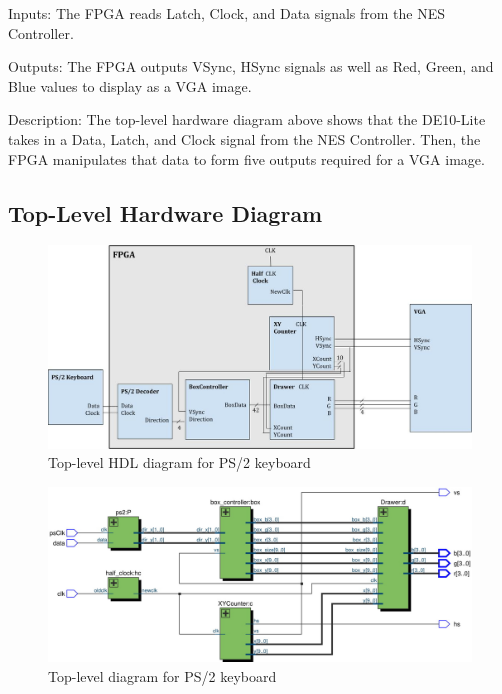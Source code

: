\documentclass[12pt]{article}
\numberwithin{figure}{subsection}
\begin{document}
Inputs: The FPGA reads Latch, Clock, and Data signals from the NES Controller.

Outputs: The FPGA outputs VSync, HSync signals as well as Red, Green, and Blue values to display as a VGA image.

Description: The top-level hardware diagram above shows that the DE10-Lite takes in a Data, Latch, and Clock signal from the NES Controller. Then, the FPGA manipulates that data to form five outputs required for a VGA image.

\subsection{Top-Level Hardware Diagram}

\begin{figure}[ht]
  \centering
  \includegraphics[width=\textwidth]{hdl_top_level.jpg}
  \caption{Top-level HDL diagram for PS/2 keyboard}
  \label{fig:hdl_top_level}
\end{figure}

\begin{figure}[ht]
  \centering
  \includegraphics[width=\textwidth]{ps2_top_level.jpg}
  \caption{Top-level diagram for PS/2 keyboard}
  \label{fig:ps2_top_level}
\end{figure}
\end{document}

